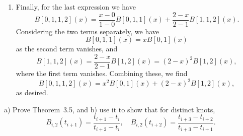 \begin{solution}
\begin{enumerate}[
    label=\alph*) %
            ]
        \item Finally, for the last expression we have
            \begin{equation*}
                B[0, 1, 1, 2](x)
                = \frac{x - 0}{1 - 0} B[0, 1, 1](x)
                + \frac{2 - x}{2 - 1} B[1, 1, 2](x).
            \end{equation*}
            Considering the two terms separately, we have
            \begin{equation*}
                B[0, 1, 1](x)
                = x B[0, 1](x)
            \end{equation*}
            as the second term vanishes, and
            \begin{equation*}
                B[1, 1, 2](x)
                = \frac{2 - x}{2 - 1} B[1, 2](x)
                = (2 -x)^2 B[1, 2](x),
            \end{equation*}
            where the first term vanishes.
            Combining these, we find
            \begin{equation*}
                B[0, 1, 1, 2](x)
                = x^2 B[0, 1](x) + (2 - x)^2 B[1, 2](x),
            \end{equation*}
            as desired.
    \end{enumerate}
\end{solution}

\begin{exercise}
    a) Prove Theorem~3.5, and b) use it to show that for distinct knots, %
    \begin{equation*}
        B_{i, 2}(t_{i+1}) = \frac{t_{i+1} - t_i}{t_{i+2} - t_i},
        \quad
        B_{i, 2}(t_{i+2}) = \frac{t_{i+3} - t_{i+2}}{t_{i+3} - t_{i+1}}.
    \end{equation*}
\end{exercise}

